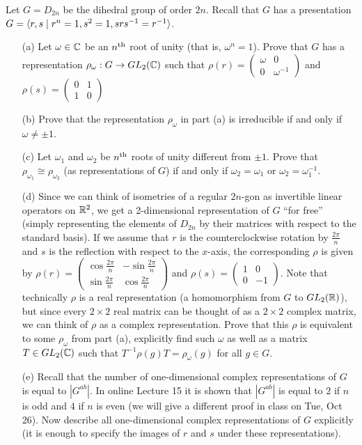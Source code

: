 \documentclass[12pt]{article}
\begin{document}
Let $G=D_{2n}$ be the dihedral group of order $2n$. Recall that $G$ has a presentation 
$G={\langle} r,s \mid r^n=1, s^2=1, srs^{-1}=r^{-1}{\rangle}$. 
\begin{itemize}
\item[(a)] Let $\omega\in{\mathbb C}$ be an $n^{\rm th}$ root of unity (that is, $\omega^n=1$). Prove that $G$ has a representation 
$\rho_{\omega}:G\to GL_2({\mathbb C})$ such that $\rho(r)=\begin{pmatrix}\omega & 0\\ 0 &\omega^{-1}
\end{pmatrix}$ and $\rho(s)=\begin{pmatrix}0 & 1\\ 1 &0\end{pmatrix}$
\item[(b)] Prove that the representation $\rho_{\omega}$ in part (a) is irreducible if and only if $\omega\neq \pm 1$.
\item[(c)] Let $\omega_1$ and $\omega_2$ be $n^{\rm th}$ roots of unity different from $\pm 1$. Prove that 
$\rho_{\omega_1}\cong \rho_{\omega_2}$ (as representations of $G$) if and only if $\omega_2=\omega_1$ or $\omega_2=\omega_1^{-1}$.
\item[(d)] Since we can think of isometries of a regular $2n$-gon as invertible linear operators on ${\mathbb R}^2$, we get a 2-dimensional representation of $G$ ``for free'' (simply representing the elements of $D_{2n}$ by their matrices with respect to the standard basis).
If we assume that $r$ is the counterclockwise rotation by $\frac{2\pi}{n}$ and $s$ is the reflection with respect to the $x$-axis, 
the corresponding $\rho$ is given by $\rho(r)=\begin{pmatrix}\cos\frac{2\pi}{n} & -\sin\frac{2\pi}{n}\\ \sin\frac{2\pi}{n} &\cos\frac{2\pi}{n}\end{pmatrix}$ and $\rho(s)=\begin{pmatrix}1 & 0\\ 0 &-1\end{pmatrix}$. Note that technically $\rho$ is a real representation
(a homomorphism from $G$ to $GL_2({\mathbb R})$), but since every $2\times 2$ real matrix can be thought of as a  $2\times 2$ complex matrix,
we can think of $\rho$ as a complex representation. Prove that this $\rho$ is equivalent to some $\rho_{\omega}$ from part (a),
explicitly find such $\omega$ as well as a matrix $T\in GL_2({\mathbb C})$ such that $T^{-1}\rho(g) T=\rho_{\omega}(g)$ for all $g\in G$. 
\item[(e)] Recall that the number of one-dimensional complex representations of $G$ is equal to $|G^{ab}|$. In online Lecture 15 it is shown that $|G^{ab}|$ is equal to $2$ if $n$ is odd and $4$ if $n$ is even (we will give a different proof in class on Tue, Oct 26). Now describe all one-dimensional complex representations of $G$ explicitly
(it is enough to specify the images of $r$ and $s$ under these representations).  
\end{itemize}
\end{document}
